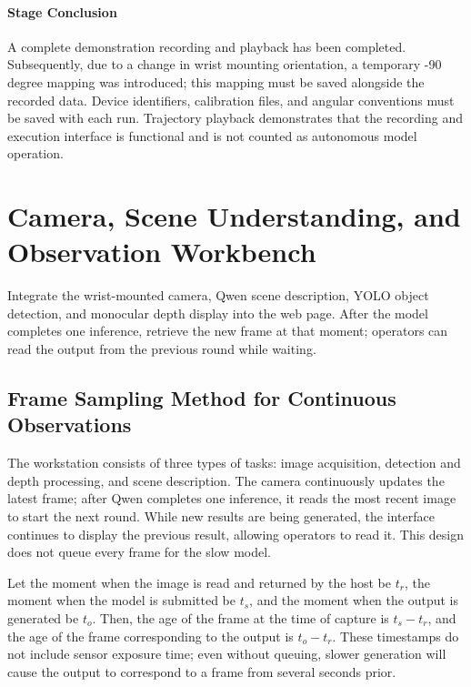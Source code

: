 \paragraph{Stage Conclusion} A complete demonstration recording and playback has been completed. Subsequently, due to a change in wrist mounting orientation, a temporary -90 degree mapping was introduced; this mapping must be saved alongside the recorded data. Device identifiers, calibration files, and angular conventions must be saved with each run. Trajectory playback demonstrates that the recording and execution interface is functional and is not counted as autonomous model operation.


\FloatBarrier

\section{Camera, Scene Understanding, and Observation Workbench}

\label{stage:s02}

Integrate the wrist-mounted camera, Qwen scene description, YOLO object detection, and monocular depth display into the web page. After the model completes one inference, retrieve the new frame at that moment; operators can read the output from the previous round while waiting.

\subsection{Frame Sampling Method for Continuous Observations}\label{s02-detail-1}

The workstation consists of three types of tasks: image acquisition, detection and depth processing, and scene description. The camera continuously updates the latest frame; after Qwen completes one inference, it reads the most recent image to start the next round. While new results are being generated, the interface continues to display the previous result, allowing operators to read it. This design does not queue every frame for the slow model.

Let the moment when the image is read and returned by the host be \(t_r\), the moment when the model is submitted be \(t_s\), and the moment when the output is generated be \(t_o\). Then, the age of the frame at the time of capture is \(t_s - t_r\), and the age of the frame corresponding to the output is \(t_o - t_r\). These timestamps do not include sensor exposure time; even without queuing, slower generation will cause the output to correspond to a frame from several seconds prior.

